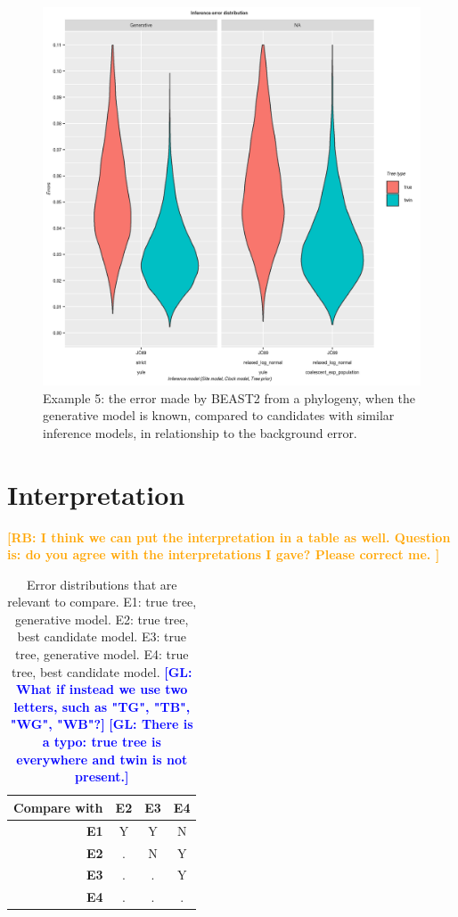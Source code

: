 \documentclass{article}
\newcommand{\giovanni}[1]{\textcolor{blue}{\textbf{[GL: #1]}}}
\newcommand{\richel}[1]{\textcolor{orange}{\textbf{[RB: #1]}}}
\begin{document}
\begin{figure}[ht]
  \includegraphics[width=\textwidth]{example_5/errors.png}
  \caption{
    Example 5: the error made by BEAST2 from a phylogeny, 
    when the generative model is known, 
    compared to candidates with similar inference models, 
    in relationship to the background error.
  }
  \label{fig:example_5}
\end{figure}

\section{Interpretation}

\richel{
  I think we can put the interpretation in a table as well.
  Question is: do you agree with the interpretations I gave?
  Please correct me.
}

\begin{table}
  \begin{tabular}{ | r | c | c | c | }
    \hline
    \textbf{Compare with} & \textbf{E2} & \textbf{E3} & \textbf{E4} \\ 
    \hline
    \textbf{E1} & Y & Y & N \\
    \textbf{E2} & . & N & Y \\
    \textbf{E3} & . & . & Y \\
    \textbf{E4} & . & . & . \\
    \hline
  \end{tabular}
  \caption{
    Error distributions that are relevant to compare.
    E1: true tree, generative model.
    E2: true tree, best candidate model.
    E3: true tree, generative model.
    E4: true tree, best candidate model.
    \giovanni{What if instead we use two letters, such as "TG", "TB", "WG", "WB"?}
    \giovanni{There is a typo: true tree is everywhere and twin is not present.}
  }
  \label{tab:relevant_comparisions}
\end{table}
\end{document}
